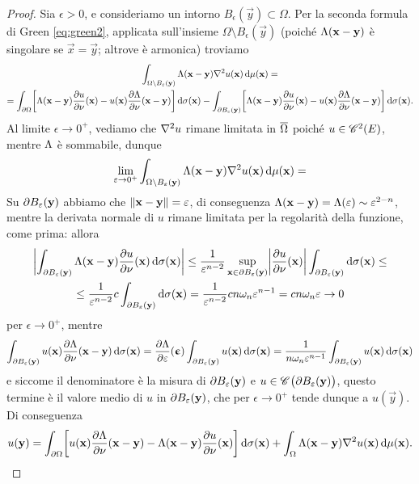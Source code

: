 \begin{proof}
    Sia $\epsilon>0$, e consideriamo un intorno $B_\epsilon(\vec y)\subset\Omega$.
    Per la seconda formula di Green \eqref{eq:green2}, applicata sull'insieme $\Omega\setminus B_\epsilon(\vec y)$ (poich\'e $\sfl(\vec x-\vec y)$ è singolare se $\vec x=\vec y$; altrove è armonica) troviamo
    \begin{multline}
        \int_{\Omega\setminus B_\epsilon(\vec y)} \sfl(\vec x-\vec y)\lap u(\vec x)\,\dd\mu(\vec x)=\\=
        \int_{\boundary\Omega} \biggl[\sfl(\vec x-\vec y)\drp{u}{\nu}(\vec x)-u(\vec x)\drp{\sfl}{\nu}(\vec x-\vec y)\biggr]\,\dd\sigma(\vec x)-
        \int_{\boundary B_\epsilon(\vec y)} \biggl[\sfl(\vec x-\vec y)\drp{u}{\nu}(\vec x)-u(\vec x)\drp{\sfl}{\nu}(\vec x-\vec y)\biggr]\,\dd\sigma(\vec x).
    \end{multline}
    Al limite $\epsilon\to 0^+$, vediamo che $\lap u$ rimane limitata in $\clos{\Omega}$ poich\'e $u\in\cont[2]{E}$, mentre $\sfl$ è sommabile, dunque
    \begin{equation}
        \lim_{\epsilon\to 0^+}\int_{\Omega\setminus B_\epsilon(\vec y)} \sfl(\vec x-\vec y)\lap u(\vec x)\,\dd\mu(\vec x)=
    \end{equation}
    Su $\boundary B_\epsilon(\vec y)$ abbiamo che $\norm{\vec x-\vec y}=\epsilon$, di conseguenza $\sfl(\vec x-\vec y)=\sfl(\epsilon)\sim\epsilon^{2-n}$, mentre la derivata normale di $u$ rimane limitata per la regolarità della funzione, come prima: allora
    \begin{multline}
        \abs[\bigg]{\int_{\boundary B_\epsilon(\vec y)} \sfl(\vec x-\vec y)\drp{u}{\nu}(\vec x)\,\dd\sigma(\vec x)}\le
        \frac1{\epsilon^{n-2}}\sup_{\vec x\in\boundary B_\epsilon(\vec y)}\abs[\bigg]{\drp{u}{\nu}(\vec x)}\int_{\boundary B_\epsilon(\vec y)}\dd\sigma(\vec x)\le\\\le
        \frac1{\epsilon^{n-2}}c\int_{\boundary B_\epsilon(\vec y)}\dd\sigma(\vec x)=
        \frac1{\epsilon^{n-2}}cn\omega_n\epsilon^{n-1}=
        cn\omega_n\epsilon\to 0
    \end{multline}
    per $\epsilon\to 0^+$, mentre
    \begin{equation}
        \int_{\boundary B_\epsilon(\vec y)} u(\vec x)\drp{\sfl}{\nu}(\vec x-\vec y)\,\dd\sigma(\vec x)=
        \drp{\sfl}{\epsilon}(\vepsilon)\int_{\boundary B_\epsilon(\vec y)} u(\vec x)\,\dd\sigma(\vec x)=
        \frac1{n\omega_n\epsilon^{n-1}} \int_{\boundary B_\epsilon(\vec y)}u(\vec x)\,\dd\sigma(\vec x)
    \end{equation}
    e siccome il denominatore è la misura di $\boundary B_\epsilon(\vec y)$ e $u\in\cont[][\big]{\boundary B_\epsilon(\vec y)}$, questo termine è il valore medio di $u$ in $\boundary B_\epsilon(\vec y)$, che per $\epsilon\to 0^+$ tende dunque a $u(\vec y)$.
    Di conseguenza
    \begin{equation}
        u(\vec y)=
        \int_{\boundary\Omega}\biggl[u(\vec x)\drp{\sfl}{\nu}(\vec x-\vec y)-\sfl(\vec x-\vec y)\drp{u}{\nu}(\vec x)\biggr]\,\dd\sigma(\vec x)+
        \int_\Omega \sfl(\vec x-\vec y)\lap u(\vec x)\,\dd\mu(\vec x).\qedhere
    \end{equation}
\end{proof}
